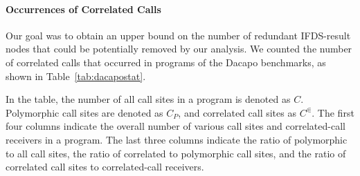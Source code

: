 \paragraph{Occurrences of Correlated Calls}
Our goal was to obtain an upper bound on the number of redundant IFDS-result nodes that could be potentially removed by our analysis.
We counted the number of correlated calls that occurred in programs of the Dacapo benchmarks, as shown in Table~\ref{tab:dacapostat}.

In the table, the number of all call sites in a program is denoted as $C$. 
Polymorphic call sites are denoted as $C_P$, and correlated call sites as $C^\Subset$. 
The first four columns indicate the overall number of various call sites and correlated-call receivers in a program. 
The last three columns indicate the ratio of polymorphic to all call sites, the ratio of correlated to polymorphic call sites, and the ratio of correlated call sites to correlated-call receivers.

